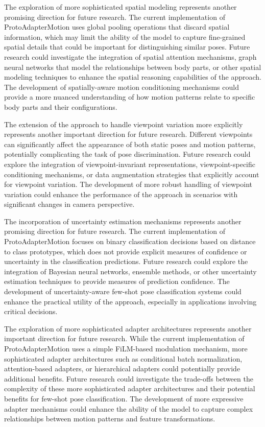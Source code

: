 \documentclass[11pt]{article}
\begin{document}
The exploration of more sophisticated spatial modeling represents another promising direction for future research. The current implementation of ProtoAdapterMotion uses global pooling operations that discard spatial information, which may limit the ability of the model to capture fine-grained spatial details that could be important for distinguishing similar poses. Future research could investigate the integration of spatial attention mechanisms, graph neural networks that model the relationships between body parts, or other spatial modeling techniques to enhance the spatial reasoning capabilities of the approach. The development of spatially-aware motion conditioning mechanisms could provide a more nuanced understanding of how motion patterns relate to specific body parts and their configurations.

The extension of the approach to handle viewpoint variation more explicitly represents another important direction for future research. Different viewpoints can significantly affect the appearance of both static poses and motion patterns, potentially complicating the task of pose discrimination. Future research could explore the integration of viewpoint-invariant representations, viewpoint-specific conditioning mechanisms, or data augmentation strategies that explicitly account for viewpoint variation. The development of more robust handling of viewpoint variation could enhance the performance of the approach in scenarios with significant changes in camera perspective.

The incorporation of uncertainty estimation mechanisms represents another promising direction for future research. The current implementation of ProtoAdapterMotion focuses on binary classification decisions based on distance to class prototypes, which does not provide explicit measures of confidence or uncertainty in the classification predictions. Future research could explore the integration of Bayesian neural networks, ensemble methods, or other uncertainty estimation techniques to provide measures of prediction confidence. The development of uncertainty-aware few-shot pose classification systems could enhance the practical utility of the approach, especially in applications involving critical decisions.

The exploration of more sophisticated adapter architectures represents another important direction for future research. While the current implementation of ProtoAdapterMotion uses a simple FiLM-based modulation mechanism, more sophisticated adapter architectures such as conditional batch normalization, attention-based adapters, or hierarchical adapters could potentially provide additional benefits. Future research could investigate the trade-offs between the complexity of these more sophisticated adapter architectures and their potential benefits for few-shot pose classification. The development of more expressive adapter mechanisms could enhance the ability of the model to capture complex relationships between motion patterns and feature transformations.
\end{document}
